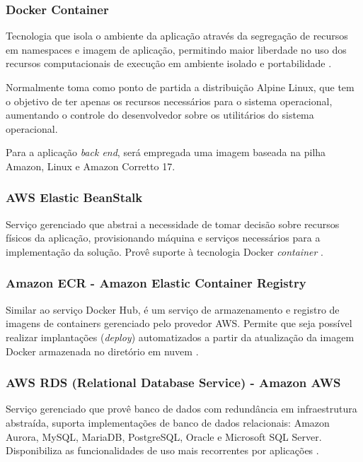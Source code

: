 \documentclass[
    12pt,               %
    openright,          %
    oneside,
    a4paper,            %
    BIBLATEX,           %
    TODO,               %
    english,            %
    brazil              %
    ]{ifsp-spo-inf-ctds}
\begin{document}
        \subsubsection{Docker Container}

            Tecnologia que isola o ambiente da aplicação através da segregação de recursos em namespaces e imagem de aplicação, permitindo maior liberdade no uso dos recursos computacionais de execução em ambiente isolado e portabilidade .
            
            Normalmente toma como ponto de partida a distribuição Alpine Linux, que tem o objetivo de ter apenas os recursos necessários para o sistema operacional, aumentando o controle do desenvolvedor sobre os utilitários do sistema operacional.
    
            Para a aplicação \emph{back end}, será empregada uma imagem baseada na pilha Amazon, Linux e Amazon Corretto 17.

        \subsubsection{AWS Elastic BeanStalk}

            Serviço gerenciado que abstrai a necessidade de tomar decisão sobre recursos físicos da aplicação, provisionando máquina e serviços necessários para a implementação da solução. Provê suporte à tecnologia Docker \emph{container} .
            
        \subsubsection{Amazon ECR - Amazon Elastic Container Registry}
        
            Similar ao serviço Docker Hub, é um serviço de armazenamento e registro de imagens de containers gerenciado pelo provedor AWS. Permite que seja possível realizar implantações (\emph{deploy}) automatizados a partir da atualização da imagem Docker armazenada no diretório em nuvem .

        \subsubsection{AWS RDS (Relational Database Service) - Amazon AWS}

            Serviço gerenciado que provê banco de dados com redundância em infraestrutura abstraída, suporta implementações de banco de dados relacionais: Amazon Aurora, MySQL, MariaDB, PostgreSQL, Oracle e Microsoft SQL Server. Disponibiliza as funcionalidades de uso mais recorrentes por aplicações .
            
\end{document}
